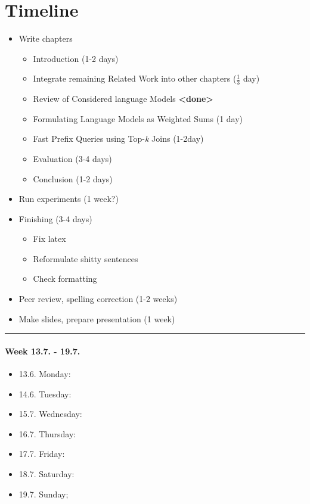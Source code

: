 \chapter{Timeline}

\begin{itemize}
  \item Write chapters
    \begin{itemize}
      \item Introduction (1-2 days)
      \item Integrate remaining Related Work into other chapters ($\frac{1}{3}$ day)
      \item Review of Considered language Models \textbf{<done>}
      \item Formulating Language Models as Weighted Sums (1 day)
      \item Fast Prefix Queries using Top-\emph{k} Joins (1-2day)
      \item Evaluation (3-4 days)
      \item Conclusion (1-2 days)
    \end{itemize}
  \item Run experiments (1 week?)
  \item Finishing (3-4 days)
    \begin{itemize}
      \item Fix latex
      \item Reformulate shitty sentences
      \item Check formatting
    \end{itemize}
  \item Peer review, spelling correction (1-2 weeks)
  \item Make slides, prepare presentation (1 week)
\end{itemize}

\clearpage
\hrule
\subsubsection*{Week 13.7. - 19.7.}
\begin{itemize}
  \item 13.6. Monday:
  \item 14.6. Tuesday:
  \item 15.7. Wednesday:
  \item 16.7. Thursday:
  \item 17.7. Friday:
  \item 18.7. Saturday:
  \item 19.7. Sunday;
\end{itemize}

